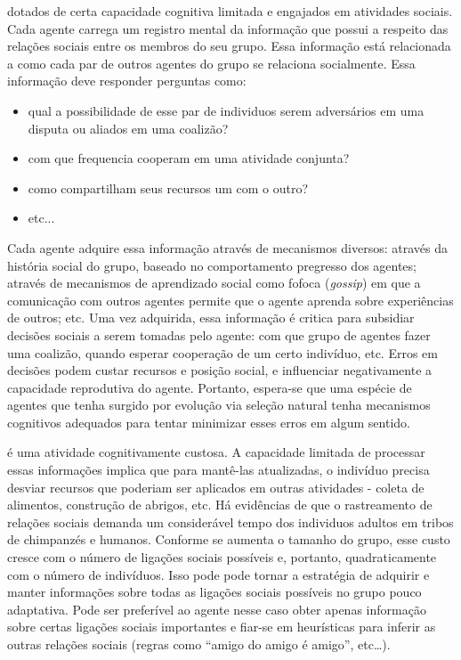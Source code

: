  dotados de certa capacidade cognitiva limitada e engajados em atividades sociais. Cada agente carrega um registro mental da informação que possui a respeito das relações sociais entre os membros do seu grupo. Essa informação está relacionada a como cada par de outros agentes do grupo se relaciona socialmente. Essa informação deve responder perguntas como: 
\begin{itemize}
 \item qual a possibilidade de esse par de individuos serem adversários em uma disputa ou aliados em uma coalizão?
 \item com que frequencia cooperam em uma atividade conjunta?
 \item como compartilham seus recursos um com o outro?
 \item etc...
\end{itemize}  
Cada agente adquire essa informação através de mecanismos diversos: através da história social do grupo, baseado no comportamento pregresso dos agentes; através de mecanismos de aprendizado social como fofoca (\textit{gossip}) em que a comunicação com outros agentes permite que o agente aprenda sobre experiências de outros; etc. Uma vez adquirida, essa informação é critica para subsidiar decisões sociais a serem tomadas pelo agente: com que grupo de agentes fazer uma coalizão, quando esperar cooperação de um certo indivíduo, etc. Erros em decisões podem custar recursos e posição social, e influenciar negativamente a capacidade reprodutiva do agente. Portanto, espera-se que uma espécie de agentes que tenha surgido por evolução via seleção natural tenha mecanismos cognitivos adequados para tentar minimizar esses erros em algum sentido. 

 é uma atividade cognitivamente custosa. A capacidade limitada de processar essas informações implica que para mantê-las atualizadas, o indivíduo precisa desviar recursos 
que poderiam ser aplicados em outras atividades - coleta de alimentos, construção de abrigos, etc. Há evidências \cite[-5em]{deWaal2007,deWaal1990}\sourcesneeded de que o rastreamento de relações sociais demanda um considerável tempo dos individuos adultos em tribos de chimpanzés e humanos. Conforme se aumenta o tamanho do grupo, esse custo cresce com o número de ligações sociais possíveis e, portanto, quadraticamente com o número de indivíduos. Isso pode pode tornar a estratégia de adquirir e manter informações sobre todas as ligações sociais possíveis no grupo pouco adaptativa. Pode ser preferível ao agente nesse caso obter apenas informação sobre certas ligações sociais importantes e fiar-se em heurísticas para inferir as outras relações sociais (regras como ``amigo do amigo é amigo'', etc\ldots{}).

